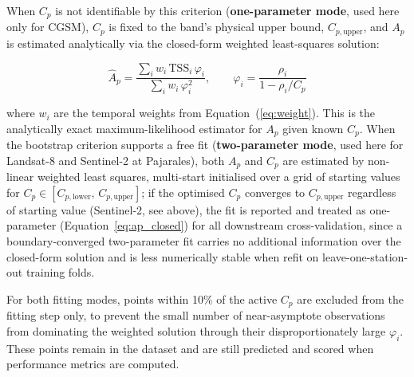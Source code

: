 \documentclass[remotesensing,article,submit,pdftex,moreauthors]{Definitions/mdpi}
\begin{document}
When $C_p$ is not identifiable by this criterion (\textbf{one-parameter
mode}, used here only for CGSM), $C_p$ is fixed to the band's physical
upper bound, $C_{p,\text{upper}}$, and $A_p$ is estimated analytically
via the closed-form weighted least-squares solution:
 
\begin{equation}
\hat{A}_p = \frac{\displaystyle\sum_{i} w_i\,\text{TSS}_i\,\varphi_i}
{\displaystyle\sum_{i} w_i\,\varphi_i^2},
\qquad
\varphi_i = \frac{\rho_i}{1 - \rho_i / C_p}
\label{eq:ap_closed}
\end{equation}
 
where $w_i$ are the temporal weights from Equation~(\ref{eq:weight}).
This is the analytically exact maximum-likelihood estimator for $A_p$
given known $C_p$. When the bootstrap criterion supports a free fit
(\textbf{two-parameter mode}, used here for Landsat-8 and Sentinel-2 at
Pajarales), both $A_p$ and $C_p$ are estimated by non-linear weighted
least squares, multi-start initialised over a grid of starting values
for $C_p \in [C_{p,\text{lower}},\, C_{p,\text{upper}}]$; if the
optimised $C_p$ converges to $C_{p,\text{upper}}$ regardless of
starting value (Sentinel-2, see above), the fit is reported and
treated as one-parameter (Equation~\ref{eq:ap_closed})
for all downstream cross-validation, since a boundary-converged
two-parameter fit carries no additional information over the
closed-form solution and is less numerically stable when refit on
leave-one-station-out training folds.
 
For both fitting modes, points within 10\% of the active $C_p$ are
excluded from the fitting step only, to prevent the small number of
near-asymptote observations from dominating the weighted solution
through their disproportionately large $\varphi_i$. These points
remain in the dataset and are still predicted and scored when
performance metrics are computed.
 
\end{document}
